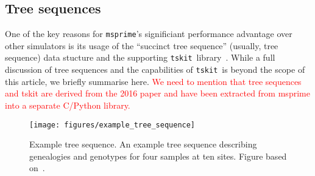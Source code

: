 \documentclass{article}
\newcommand{\msprime}[0]{\texttt{msprime}}
\newcommand{\tskit}[0]{\texttt{tskit}}
\newcommand{\jkcomment}[1]{\textcolor{red}{#1}}
\begin{document}

\subsection*{Tree sequences}
\label{sec-ts}
One of the key reasons for \msprime's significiant performance advantage
over other simulators is its usage of the ``succinct tree sequence''
(usually, tree sequence) data stucture and the supporting \tskit\
library~\citep{tskit2021tskit}.
While a full discussion of tree sequences and the capabilities
of \tskit\ is beyond the scope of this article, we briefly summarise
here.
\jkcomment{We need to mention that tree sequences and tskit are
derived from the 2016 paper and have been extracted from msprime
into a separate C/Python library.}

\begin{figure}
\begin{center}
\texttt{[image: figures/example\_tree\_sequence]}
\end{center}
\caption{\label{fig-ts-example} Example tree sequence.
An example tree sequence describing genealogies and genotypes
for four samples at ten sites.
Figure based on~\citet{kelleher2018efficient}.
}
\end{figure}
\end{document}
